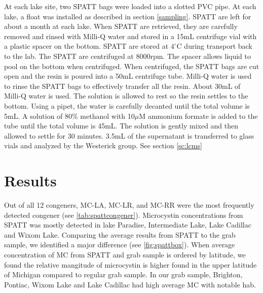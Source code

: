 At each lake site, two SPATT bags were loaded into a slotted PVC pipe. At each lake, a float was installed as described in section \ref{sampling}. SPATT are left for about a month at each lake. When SPATT are retrieved, they are carefully removed and rinsed with Milli-Q water and stored in a 15mL centrifuge vial with a plastic spacer on the bottom. SPATT are stored at $4^\circ$C during transport back to the lab. The SPATT are centrifuged at 8000rpm. The spacer allows liquid to pool on the bottom when centrifuged. When centrifuged, the SPATT bags are cut open and the resin is poured into a 50mL centrifuge tube. Milli-Q water is used to rinse the SPATT bags to effectively transfer all the resin. About 30mL of Milli-Q water is used. The solution is allowed to rest so the resin settles to the bottom. Using a pipet, the water is carefully decanted until the total volume is 5mL.  A solution of 80\% methanol with 10$\mu$M ammonium formate is added to the tube until the total volume is 45mL. The solution is gently mixed and then allowed to settle for 30 minutes. 3.5mL of the supernatant is transferred to glass vials and analyzed by the Westerick group. See section \ref{sc:lcms}

\section{Results}

Out of all 12 congeners, MC-LA, MC-LR, and MC-RR were the most frequently detected congener (see \ref{tab:spattcongener}). Microcystin concentrations from SPATT was mostly detected in lake Paradise, Intermediate Lake, Lake Cadillac and Wixom Lake. Comparing the average results from SPATT to the grab sample, we identified a major difference (see \ref{fig:spattbox}). When average concentration of MC from SPATT and grab sample is ordered by latitude, we found the relative mangitude of microcystin is higher found in the upper latitude of Michigan compared to regular grab sample. In our grab sample, Brighton, Pontiac, Wixom Lake and Lake Cadillac had high average MC with notable \gls{hab}.


